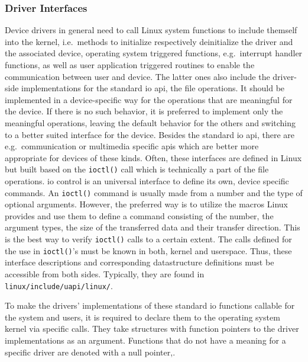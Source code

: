 \subsubsection*{Driver Interfaces}
Device drivers in general need to call Linux system functions to include themself into the kernel, i.e.\ methods to initialize respectively deinitialize the driver and the associated device, operating system triggered functions, e.g.\ interrupt handler functions, as well as user application triggered routines to enable the communication between user and device\cite{quade2016Linux}.
The latter ones also include the driver-side implementations for the standard \ac{io} \ac{api}, the file operations.
It should be implemented in a device-specific way for the operations that are meaningful for the device.
If there is no such behavior, it is preferred to implement only the meaningful operations, leaving the default behavior for the others and switching to a better suited interface for the device.
Besides the standard \ac{io} \ac{api}, there are e.g.\ communication or multimedia specific \acp{api} which are better more appropriate for devices of these kinds.
Often, these interfaces are defined in Linux but built based on the \texttt{ioctl()} call which is technically a part of the file operations\cite{quade2016Linux}.
\ac{io} control is an universal interface to define its own, device specific commands.
An \texttt{ioctl()} command is usually made from a number and the type of optional arguments.
However, the preferred way is to utilize the macros Linux provides and use them to define a command consisting of the number, the argument types, the size of the transferred data and their transfer direction\cite{quade2016Linux}.
This is the best way to verify \texttt{ioctl()} calls to a certain extent.
The calls defined for the use in \texttt{ioctl()}'s must be known in both, kernel and userspace.
Thus, these interface descriptions and corresponding datastructure definitions must be accessible from both sides.
Typically, they are found in \texttt{linux/include/uapi/linux/}\cite{quade2016Linux}.

To make the drivers' implementations of these standard \ac{io} functions callable for the system and users, it is required to declare them to the operating system kernel via specific calls.
They take structures with function pointers to the driver implementations as an argument.
Functions that do not have a meaning for a specific driver are denoted with a null pointer\cite{glatz2015betriebssysteme},\cite{quade2016Linux}.

